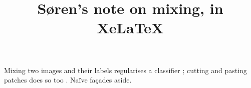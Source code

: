 \documentclass[11pt]{article}
\title{Søren's note on mixing, in XeLaTeX}
\author{}
\date{}
\begin{document}
\maketitle

Mixing two images and their labels regularises a classifier \parencite{zhang2018mixup}; cutting
and pasting patches does so too \parencite{yun2019cutmix}. Naïve façades aside.

\printbibliography
\end{document}
